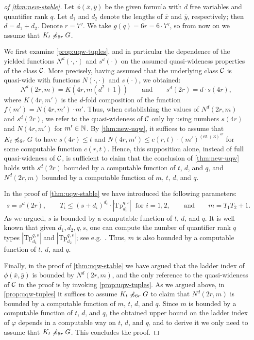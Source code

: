 \begin{proof}[of \cref{thm:new-stable}]
	Let $\phi(\bar x,\bar y)$ be the given formula with $d$ free variables and quantifier rank $q$. Let $d_1$ and $d_2$ denote the lengths of $\bar x$ and $\bar y$, respectively; then $d=d_1+d_2$.
	Denote $r=7^q$. We take $g(q)=6r=6\cdot 7^q$, so from now on we assume that $K_t\not\preccurlyeq_{6r} G$.

We first examine \cref{prop:uqw-tuples}, and in particular the dependence of the yielded functions 
$N^d(\cdot,\cdot)$ and $s^d(\cdot)$ on the assumed quasi-wideness properties of the class $\mathcal{C}$.
More precisely, having assumed that the underlying class $\mathcal{C}$ is quasi-wide with functions $N(\cdot,\cdot)$ and $s(\cdot)$,
we obtained:
$$
N^d(2r,m)=K(4r,m(d^2+1))\qquad\textrm{and}\qquad s^d(2r)=d\cdot s(4r),
$$
where $K(4r,m')$ is the $d$-fold composition of the function $f(m')=N(4r,m')\cdot m'$.
Thus, when establishing the values of $N^d(2r,m)$ and $s^d(2r)$, we refer to the quasi-wideness of $\mathcal{C}$ only by using numbers $s(4r)$ and $N(4r,m')$ for $m'\in \mathbb{N}$.
By \cref{thm:new-uqw}, it suffices to assume that $K_t\not\preccurlyeq_{6r} G$ to have $s(4r)\leq t$ and $N(4r,m')\leq c(r,t)\cdot (m')^{(6t+3)^{4r}}$ for some computable function $c(r,t)$.
Hence, this supposition alone, instead of full quasi-wideness of $\mathcal{C}$, is sufficient to claim that the conclusion of \cref{thm:new-uqw} holds with
$s^d(2r)$ bounded by a computable function of $t$, $d$, and $q$, and $N^d(2r,m)$ bounded by a computable function of $m$, $t$, $d$, and $q$.

	In the proof of \cref{thm:uqw-stable} we have introduced the following parameters:
	\begin{eqnarray*}
	s=s^d(2r), \qquad T_i\le (s+d_i)^{d_i}\cdot |\mathrm{Tp}_{d_i}^{q,s}|\ \textrm{ for $i=1,2$},\qquad\textrm{and}\qquad m=T_1T_2+1.
	\end{eqnarray*}
	As we argued, $s$ is bounded by a computable function of $t$, $d$, and $q$.
	It is well known that given $d_1,d_2,q,s$, one can compute the number of quantifier rank $q$ types $|\mathrm{Tp}_{d_1}^{q,s}|$ and $|\mathrm{Tp}_{d_2}^{q,s}|$; see e.g.~\cite{libkin}.
	Thus, $m$ is also bounded by a computable function of $t$, $d$, and $q$.
	
Finally, in the proof of \cref{thm:uqw-stable} we have argued that the ladder index of $\phi(\bar x,\bar y)$ is bounded by $N^d(2r,m)$, and the only reference to the quasi-wideness of $\mathcal{C}$ in the proof
is by invoking \cref{prop:uqw-tuples}.
As we argued above, in \cref{prop:uqw-tuples} it suffices to assume $K_t\not\preccurlyeq_{6r} G$ to claim that $N^d(2r,m)$ is bounded by a computable function of $m$, $t$, $d$, and $q$.
Since $m$ is bounded by a computable function of $t$, $d$, and $q$, the obtained upper bound on the ladder index of $\varphi$ depends in a computable way on $t$, $d$, and $q$,
and to derive it we only need to assume that $K_t\not\preccurlyeq_{6r} G$. This concludes the proof.
\end{proof}

